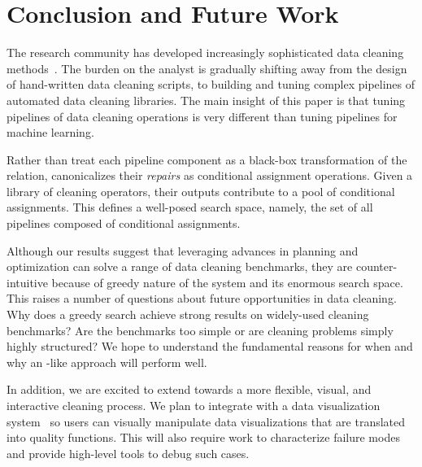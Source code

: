 \section{Conclusion and Future Work}
The research community has developed increasingly sophisticated data cleaning methods~\cite{dc, rekatsinas2017holoclean, DBLP:journals/pvldb/KrishnanWWFG16, DBLP:conf/sigmod/ChuIKW16, mudgal2018deep, doan2018toward}.
The burden on the analyst is gradually shifting away from the design of hand-written data cleaning scripts, to building and tuning complex pipelines of automated data cleaning libraries.
The main insight of this paper is that tuning pipelines of data cleaning operations is very different than tuning pipelines for machine learning.

Rather than treat each pipeline component as a black-box transformation of the relation, \sys canonicalizes their {\it  repairs} as conditional assignment operations.   Given a library of  cleaning operators, their outputs contribute to a pool of conditional assignments. This defines a well-posed search space, namely, the set of all pipelines composed of conditional assignments.  %
  
Although our results suggest that leveraging advances in planning and optimization can solve a range of data cleaning benchmarks, they are counter-intuitive because of greedy nature of the system and its enormous search space.  This raises a number of questions about future opportunities in data cleaning.  Why does a greedy search achieve strong results on widely-used cleaning benchmarks? Are the benchmarks too simple or are cleaning problems simply highly structured?  We hope to understand the fundamental reasons for when and why an \sys-like approach will perform well.

In addition, we are excited to extend \sys towards a more flexible, visual, and interactive cleaning process.  We plan to integrate \sys with a data visualization system~\cite{Wu2017CombiningDA} so users can visually manipulate data visualizations that are translated into quality functions.  This will also require work to characterize failure modes and provide high-level tools to debug such cases.  




